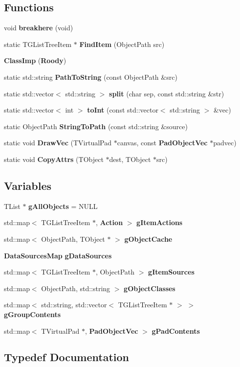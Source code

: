\subsection*{Functions}
\begin{DoxyCompactItemize}
\item 
void {\bf breakhere} (void)
\item 
static TGListTreeItem $\ast$ {\bf FindItem} (ObjectPath src)
\item 
{\bf ClassImp} ({\bf Roody})
\item 
static std::string {\bf PathToString} (const ObjectPath \&src)
\item 
static std::vector$<$ std::string $>$ {\bf split} (char sep, const std::string \&str)
\item 
static std::vector$<$ int $>$ {\bf toInt} (const std::vector$<$ std::string $>$ \&vec)
\item 
static ObjectPath {\bf StringToPath} (const std::string \&source)
\item 
static void {\bf DrawVec} (TVirtualPad $\ast$canvas, const {\bf PadObjectVec} $\ast$padvec)
\item 
static void {\bf CopyAttrs} (TObject $\ast$dest, TObject $\ast$src)
\end{DoxyCompactItemize}
\subsection*{Variables}
\begin{DoxyCompactItemize}
\item 
TList $\ast$ {\bf gAllObjects} = NULL
\item 
std::map$<$ TGListTreeItem $\ast$, {\bf Action} $>$ {\bf gItemActions}
\item 
std::map$<$ ObjectPath, TObject $\ast$ $>$ {\bf gObjectCache}
\item 
{\bf DataSourcesMap} {\bf gDataSources}
\item 
std::map$<$ TGListTreeItem $\ast$, ObjectPath $>$ {\bf gItemSources}
\item 
std::map$<$ ObjectPath, std::string $>$ {\bf gObjectClasses}
\item 
std::map$<$ std::string, std::vector$<$ TGListTreeItem $\ast$ $>$ $>$ {\bf gGroupContents}
\item 
std::map$<$ TVirtualPad $\ast$, {\bf PadObjectVec} $>$ {\bf gPadContents}
\end{DoxyCompactItemize}


\subsection{Typedef Documentation}
